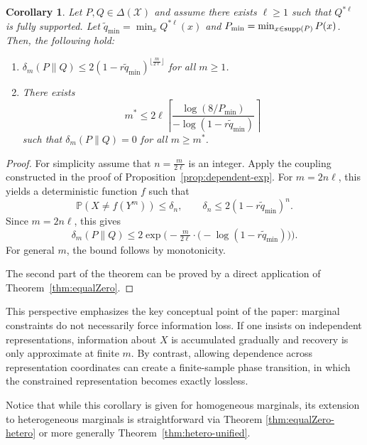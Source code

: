 \documentclass[journal]{IEEEtran}
\newtheorem{corollary}{Corollary}
\def\supp{\mathop{\rm supp}}
\def\calX{{\mathcal X}}
\newcommand{\1}{\mathbf{1}}
\begin{document}
\begin{corollary}\label{thm:nis}
Let $P,Q\in\Delta(\calX)$ and assume there exists $\ell\ge1$ such that $Q^{*\ell}$ is fully supported. Let $\widetilde q_{\min}=\min_x Q^{*\ell}(x)$ and $P_{\min}=\min_{x\in\supp(P)}P(x)$. Then, the following hold: 
\begin{enumerate}
\item $\delta_m(P\|Q)\le 2(1-r\widetilde q_{\min})^{\lfloor\frac{m}{2\ell}\rfloor}$ for all $m\ge1$.
\item There exists $$m^*\le 2\ell\left\lceil \frac{\log(8/P_{\min})}{-\log(1-r\widetilde q_{\min})}\right\rceil$$ 
such that $\delta_m(P\|Q)=0$ for all $m\ge m^*$.
\end{enumerate}
\end{corollary}
\begin{proof}
 For simplicity assume that $n = \tfrac{m}{2\ell}$ is an integer. Apply the coupling constructed in the proof of Proposition~\ref{prop:dependent-exp}. For $m=2n\ell$, this yields a deterministic function $f$ such that
\[
\mathbb{P}(X\neq f(Y^m))\le \delta_n,
\qquad
\delta_n\le 2(1-r\widetilde q_{\min})^n.
\]
Since $m=2n\ell$, this gives
\[
\delta_m(P\|Q) \le 2\exp\!\Big(-\tfrac{m}{2\ell}\cdot \big(-\log(1-r\widetilde q_{\min})\big)\Big).
\]
For general $m$, the bound follows by monotonicity.

The second part of the theorem can be proved by a direct application of Theorem~\ref{thm:equalZero}. 
\end{proof}
This perspective emphasizes the key conceptual point of the paper: marginal constraints do not necessarily force information loss. If one insists on independent representations, information about $X$ is accumulated gradually and recovery is only approximate at finite $m$. By contrast, allowing dependence across representation coordinates can create a finite-sample phase transition, in which the constrained representation becomes exactly lossless. 

Notice that while this corollary is given for homogeneous marginals, its extension to heterogeneous marginals is straightforward via Theorem \ref{thm:equalZero-hetero} or more generally Theorem~\ref{thm:hetero-unified}.  
\end{document}
